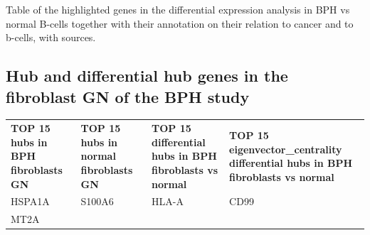 Table of the highlighted genes in the differential expression analysis
in BPH vs normal B-cells together with their annotation on their
relation to cancer and to b-cells, with sources.

\subsection{Hub and differential hub genes in the fibroblast
GN of the BPH
study}\label{table-s12-hub-and-differential-hub-genes-in-the-fibroblast-gn-of-the-bph-study}

\begin{longtable}[H]{@{}
  >{\raggedright\arraybackslash}p{}
  >{\raggedright\arraybackslash}p{}
  >{\raggedright\arraybackslash}p{}
  >{\raggedright\arraybackslash}p{}@{}}
\toprule\noalign{}
\begin{minipage}[b]{\linewidth}\raggedright
\textbf{TOP 15 hubs in BPH fibroblasts GN}
\end{minipage} & \begin{minipage}[b]{\linewidth}\raggedright
\textbf{TOP 15 hubs in normal fibroblasts GN}
\end{minipage} & \begin{minipage}[b]{\linewidth}\raggedright
\textbf{TOP 15 differential hubs in BPH fibroblasts vs normal}
\end{minipage} & \begin{minipage}[b]{\linewidth}\raggedright
\textbf{TOP 15 eigenvector\_centrality differential hubs in BPH
fibroblasts vs normal}
\end{minipage} \\
\begin{minipage}[b]{\linewidth}\raggedright
HSPA1A
\end{minipage} & \begin{minipage}[b]{\linewidth}\raggedright
S100A6
\end{minipage} & \begin{minipage}[b]{\linewidth}\raggedright
HLA-A
\end{minipage} & \begin{minipage}[b]{\linewidth}\raggedright
CD99
\end{minipage} \\
\begin{minipage}[b]{\linewidth}\raggedright
MT2A
\end{minipage} & \begin{minipage}[b]{\linewidth}\raggedright

\end{minipage}
\end{longtable}
